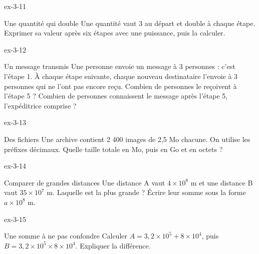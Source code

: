 \begin{blocLivre}{ex-3-11}\begin{exercice}[3]{Une quantité qui double}
Une quantité vaut 3 au départ et double à chaque étape. Exprimer sa valeur après six étapes avec une puissance, puis la calculer.
\end{exercice}\end{blocLivre}
\begin{blocLivre}{ex-3-12}\begin{exercice}[3]{Un message transmis}
Une personne envoie un message à 3 personnes : c’est l’étape 1. À chaque étape suivante, chaque nouveau destinataire l’envoie à 3 personnes qui ne l’ont pas encore reçu. Combien de personnes le reçoivent à l’étape 5 ? Combien de personnes connaissent le message après l’étape 5, l’expéditrice comprise ?
\end{exercice}\end{blocLivre}
\begin{blocLivre}{ex-3-13}\begin{exercice}[3]{Des fichiers}
Une archive contient 2 400 images de 2,5 Mo chacune. On utilise les préfixes décimaux. Quelle taille totale en Mo, puis en Go et en octets ?
\end{exercice}\end{blocLivre}
\begin{blocLivre}{ex-3-14}\begin{exercice}[3]{Comparer de grandes distances}
Une distance A vaut $4\times10^8$ m et une distance B vaut $35\times10^7$ m. Laquelle est la plus grande ? Écrire leur somme sous la forme $a\times10^8$ m.
\end{exercice}\end{blocLivre}
\begin{blocLivre}{ex-3-15}\begin{exercice}[3]{Une somme à ne pas confondre}
Calculer $A=3{,}2\times10^5+8\times10^4$, puis $B=3{,}2\times10^5\times8\times10^4$. Expliquer la différence.
\end{exercice}\end{blocLivre}

\clearpage
